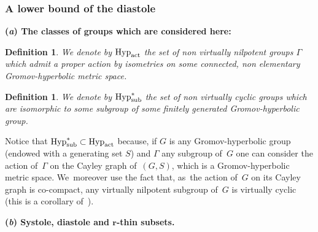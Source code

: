 \documentclass[pdftex]{sigma}
\numberwithin{equation}{section}
\newtheorem{defi}[theor]{Definition}
\begin{document}
\subsubsection{A lower bound of the diastole}\label{diastolebound}

{\bf (\emph{a}) The classes of groups which are considered here:}
\begin{defi}%
We denote by $\text{\rm Hyp}_{\rm act}$ the set of non virtually nilpotent groups $\Gamma$ which admit
a proper action by isometries on some connected, non elementary Gromov-hyperbolic metric space.
\end{defi}

\begin{defi}%
We denote by $\text{\rm Hyp}_{\rm sub}^*$ the set of non virtually cyclic
groups which are isomorphic to some subgroup of some finitely
generated Gromov-hyperbolic group.
\end{defi}

Notice that $\text{\rm Hyp}_{\rm sub}^* \subset \text{\rm Hyp}_{\rm act}$
because, if $G$ is any Gromov-hyperbolic group (endowed with a generating
set
$S$) and $\Gamma$ any subgroup of~$G$ one can consider the action of~$\Gamma$ on the Cayley graph of~$(G,S)$, which is a Gromov-hyperbolic metric space. We~moreover use the fact that, as~the action of~$G$ on its Cayley graph is co-compact, any virtually nilpotent subgroup of~$G$ is virtually
cyclic (this is a corollary of~\cite[Section~8, Th\'eor\`eme 37, p.~157]{GH}).

\medskip\noindent
{\bf (\emph{b}) Systole, diastole and $\boldsymbol r$-thin subsets.}
\end{document}
